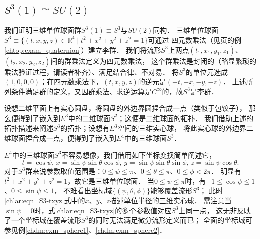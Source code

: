 \subsection{$S^3(1)\cong SU(2)$}\label{chlar:sec_S3SU2}


我们证明三维单位球面群$S^3(1)\equiv S^3$与$SU(2)$同构．
三维单位球面$S^3\equiv \{(t,x,y,z)\in \mathbb{R}^4 \mid t^2+x^2+y^2+z^2=1 \}$可通过
四元数乘法（见\pageref{chtop:exam_quaternion}页的例\ref{chtop:exam_quaternion}）建立李群．
我们将流形$S^3$上两点$(t_1,x_1,y_1,z_1)$、$(t_2,x_2,y_2,z_2)$间的{\kaishu 群乘法定义为四元数乘法}，
这个群乘法是封闭的（略显繁琐的乘法验证过程，请读者补齐）、满足结合律、不对易．
将$S^3$的单位元选成$(1,0,0,0)$；在四元数乘法下，$(t,x,y,z)$的逆元是$(+t,-x,-y,-z)$．
上述所列条件满足群的定义，又因群乘法、求逆运算是$C^\infty$的，故$S^3$是李群．

设想二维平面上有实心圆盘，将圆盘的外边界圆捏合成一点（类似于包饺子），
那么便得到了嵌入到$E^3$中的二维球面$S^2$；这便是二维球面的拓扑．
我们借助上述的拓扑描述来阐述$S^3$的拓扑；设想有$E^3$空间的三维实心球，
将此实心球的外边界二维球面捏合成一点，便得到了嵌入到$E^4$中的三维球面$S^3$．

$E^4$中的三维球面$S^3$不容易想像，我们借用如下坐标变换简单阐述它，
\begin{equation}\label{chlar:eqn_S3-txyz}
	t=\cos \psi, \, x=\sin\psi  \sin\theta \cos \phi,        \,
	y=\sin \psi \sin\theta \sin \phi,\, z=\sin \psi \cos \theta .
\end{equation}
对于$S^3$群来说参数取值范围是：$0 \leqslant \psi \leqslant \pi$、$ 0\leqslant \theta \leqslant \pi $、$0\leqslant \phi  < 2\pi$．
明显有$t^2+x^2+y^2+z^2=1$，故它是三维单位球面．
当$0 \leqslant \psi \leqslant \pi$时，有$-1 \leqslant \cos \psi \leqslant 1$、$0 \leqslant \sin \psi \leqslant 1$，
不难看出坐标域$\{(\psi,\theta,\phi)\}$能够覆盖流形$S^3$；
此时\eqref{chlar:eqn_S3-txyz}式中的$x$、$y$、$z$描述单位半径的三维实心球．
需注意当$\sin\psi=0$时，式\eqref{chlar:eqn_S3-txyz}的多个参数值对应$S^3$上同一点，
这无非反映了一个坐标域在覆盖流形$S^3$的同时无法满足微分流形定义而已；
全面的坐标域可参见例\ref{chdm:exm_sphere1}、\ref{chdm:exm_sphere2}．



